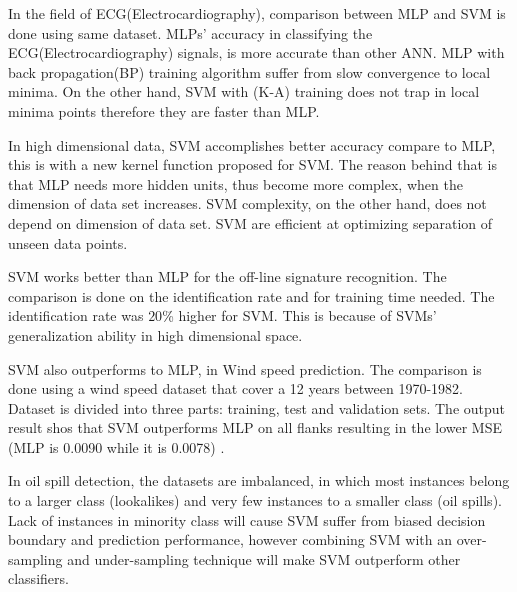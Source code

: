 In the field of ECG(Electrocardiography), comparison between MLP and SVM is done using same dataset. MLPs' accuracy in classifying the ECG(Electrocardiography) signals, is more accurate than other ANN. MLP with back propagation(BP) training algorithm suffer from slow convergence to local minima. On the other hand, SVM with (K-A) training does not trap in local minima points therefore they are faster than MLP\cite{Moavenian20103088}.

In high dimensional data, SVM accomplishes better accuracy compare to MLP, this is with a new kernel function proposed for SVM. The reason behind that is that MLP needs more hidden units, thus become more complex, when the dimension of data set increases. SVM complexity, on the other hand, does not depend on dimension of data set. SVM are efficient at optimizing separation of unseen data points\cite{Zanaty2012177}.

SVM works better than MLP for the off-line signature recognition. The comparison is done on the identification rate and for training time needed. The identification rate was $20$\% higher for SVM. This is because of SVMs' generalization ability in high dimensional space\cite{FriasMartinez2006693}.

SVM also outperforms to MLP, in Wind speed prediction. The comparison is done using a wind speed dataset that cover a 12 years between 1970-1982. Dataset is divided into three parts: training, test and validation sets. The output result shos that SVM outperforms MLP on all flanks resulting in the lower MSE (MLP is 0.0090 while it is 0.0078) \cite{Mohandes2004939}.

In oil spill detection, the datasets are imbalanced, in which most instances belong to a larger class (lookalikes) and very few instances to a smaller class (oil spills). Lack of instances in minority class will cause SVM suffer from biased decision boundary and prediction performance, however combining SVM with an over-sampling and under-sampling technique will make SVM outperform other classifiers\cite{liu2006boosting}.
